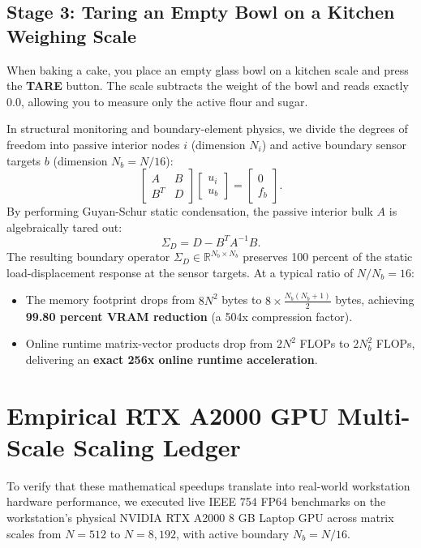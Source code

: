 \documentclass[11pt,a4paper]{article}
\begin{document}
\subsection{Stage 3: Taring an Empty Bowl on a Kitchen Weighing Scale}
When baking a cake, you place an empty glass bowl on a kitchen scale and press the \textbf{TARE} button. The scale subtracts the weight of the bowl and reads exactly 0.0, allowing you to measure only the active flour and sugar.

In structural monitoring and boundary-element physics, we divide the degrees of freedom into passive interior nodes $i$ (dimension $N_i$) and active boundary sensor targets $b$ (dimension $N_b = N/16$):
\begin{equation}
\begin{bmatrix} A & B \\ B^T & D \end{bmatrix} \begin{bmatrix} u_i \\ u_b \end{bmatrix} = \begin{bmatrix} 0 \\ f_b \end{bmatrix}.
\end{equation}
By performing Guyan-Schur static condensation, the passive interior bulk $A$ is algebraically tared out:
\begin{equation}
\Sigma_D = D - B^T A^{-1} B.
\end{equation}
The resulting boundary operator $\Sigma_D \in \mathbb{R}^{N_b \times N_b}$ preserves 100 percent of the static load-displacement response at the sensor targets. 
At a typical ratio of $N / N_b = 16$:
\begin{itemize}
    \item The memory footprint drops from $8 N^2$ bytes to $8 \times \frac{N_b(N_b+1)}{2}$ bytes, achieving \textbf{99.80 percent VRAM reduction} (a 504x compression factor).
    \item Online runtime matrix-vector products drop from $2 N^2$ FLOPs to $2 N_b^2$ FLOPs, delivering an \textbf{exact 256x online runtime acceleration}.
\end{itemize}

\section{Empirical RTX A2000 GPU Multi-Scale Scaling Ledger}
To verify that these mathematical speedups translate into real-world workstation hardware performance, we executed live IEEE 754 FP64 benchmarks on the workstation's physical NVIDIA RTX A2000 8 GB Laptop GPU across matrix scales from $N = 512$ to $N = 8,192$, with active boundary $N_b = N/16$. 
\end{document}

